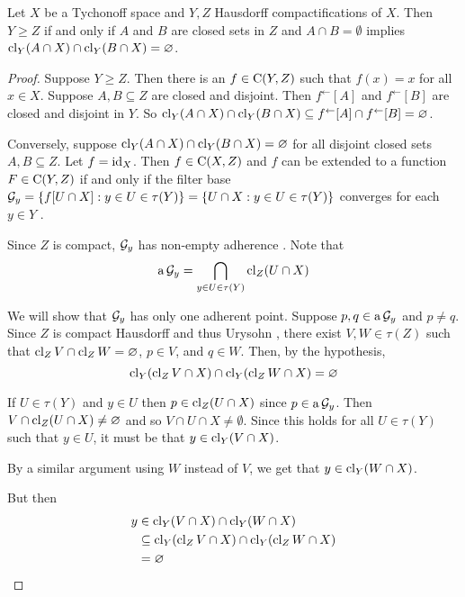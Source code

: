\begin{theorem}
	\label{taimanov}
	Let \( X \) be a Tychonoff space and \( Y,Z \) Hausdorff compactifications of \( X \).  Then \( Y \geq Z \) if and only if \( A \) and \( B \) are closed sets in \( Z \) and \( A \cap B = \emptyset \) implies \( \operatorname{cl}_Y(A \cap X) \cap \operatorname{cl}_Y(B \cap X) = \varnothing \).
\end{theorem}
\begin{proof}
	Suppose \( Y \geq Z \).  Then there is an \( f \in \operatorname{C}(Y,Z) \) such that \( f(x) = x \) for all \( x \in X \).  Suppose \( A,B \subseteq Z \) are closed and disjoint.  Then \( f^\leftarrow[A] \) and \( f^\leftarrow[B] \) are closed and disjoint in \( Y \).  So \( \operatorname{cl}_Y(A \cap X) \cap \operatorname{cl}_Y(B \cap X) \subseteq f^\leftarrow[A] \cap f^\leftarrow[B] = \varnothing \).
	
	Conversely, suppose \( \operatorname{cl}_Y(A \cap X) \cap \operatorname{cl}_Y(B \cap X) = \varnothing \) for all disjoint closed sets \( A,B \subseteq Z \).  Let \( f = \operatorname{id}_X \).  Then \( f \in \operatorname{C}(X,Z) \) and \( f \) can be extended to a function \( F \in \operatorname{C}(Y,Z) \) if and only if the filter base \( \mathcal{G}_y = \{ f[U \cap X]: y \in U \in \tau(Y) \} = \{ U \cap X: y \in U \in \tau(Y) \} \) converges for each \( y \in Y \) \cite[4.1(l)]{porter}.
	
	Since \( Z \) is compact, \( \mathcal{G}_y \) has non-empty adherence \cite[V.5.1]{gaal}.  Note that
	\[ \operatorname{a}{\mathcal{G}_y} = \bigcap_{y \in U \in \tau(Y)} \operatorname{cl}_Z(U \cap X) \]
	
	We will show that \( \mathcal{G}_y \) has only one adherent point.  Suppose \( p,q \in \operatorname{a}{\mathcal{G}_y} \) and \( p \neq q \).  Since \( Z \) is compact Hausdorff and thus Urysohn \cite[p.141]{kelley}, there exist \( V,W \in \tau(Z) \) such that \( \operatorname{cl}_Z{V} \cap \operatorname{cl}_Z{W} = \varnothing \), \( p \in V \), and \( q \in W \).  Then, by the hypothesis,
	\[ \operatorname{cl}_Y(\operatorname{cl}_Z V \cap X) \cap \operatorname{cl}_Y(\operatorname{cl}_Z W \cap X) = \varnothing \]
	
	If \( U \in \tau(Y) \) and \( y \in U \) then \( p \in \operatorname{cl}_Z(U \cap X) \) since \( p \in \operatorname{a}{\mathcal{G}_y} \).  Then \( V \cap \operatorname{cl}_Z(U \cap X) \neq \varnothing \) and so \( V \cap U \cap X \neq \emptyset \).  Since this holds for all \( U \in \tau(Y) \) such that \( y \in U \), it must be that \( y \in \operatorname{cl}_Y(V \cap X) \).
	
	By a similar argument using \( W \) instead of \( V \), we get that \( y \in \operatorname{cl}_Y(W \cap X) \).
	
	But then
	\begin{align*}
		y &\in \operatorname{cl}_Y(V \cap X) \cap \operatorname{cl}_Y(W \cap X) \\
		&\subseteq \operatorname{cl}_Y(\operatorname{cl}_Z{V} \cap X) \cap \operatorname{cl}_Y(\operatorname{cl}_Z{W} \cap X) \\
		&= \varnothing
	\end{align*}
	

\end{proof}

